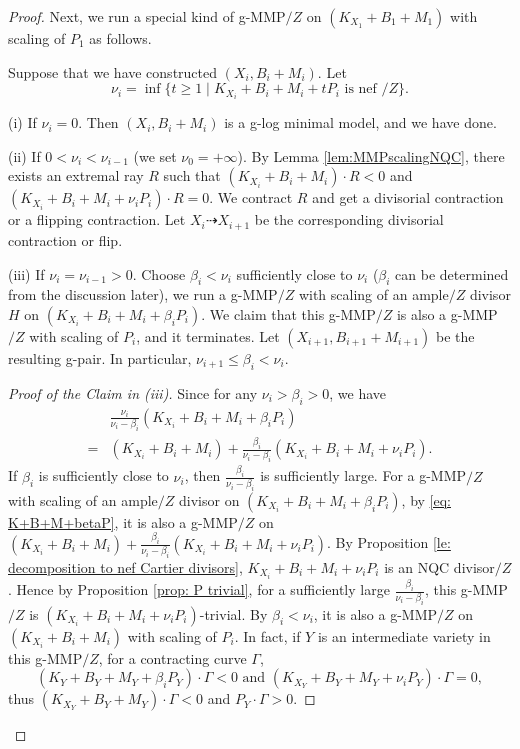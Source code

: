\documentclass[11pt]{amsart}
\begin{document}
\begin{proof}
	Next, we run a special kind of g-MMP$/Z$ on $(K_{X_1}+B_1+M_1)$ with scaling of $P_1$ as follows. 
	
	Suppose that we have constructed $(X_i,B_i+M_i)$. Let 
	\[
	\nu_i = \inf\{t \geq 1 \mid K_{X_i}+B_i+M_i+t P_i \text{~is nef~}/Z\}.
	\] 
	
	(i) If $\nu_i=0$. Then $({X_i}, B_i+M_i)$ is a g-log minimal model, and we have done. 
	
	(ii) If $0<\nu_i<\nu_{i-1}$ (we set $\nu_0=+\infty$). By Lemma \ref{lem:MMPscalingNQC}, there exists an extremal ray $R$ such that $(K_{X_i}+B_i+M_i)\cdot R<0$ and $(K_{X_i}+B_i+M_i+\nu_iP_i)\cdot R=0$. We contract $R$ and get a divisorial contraction or a flipping contraction. Let $X_i\dashrightarrow X_{i+1}$ be the corresponding divisorial contraction or flip.
	
	(iii) If $\nu_i=\nu_{i-1}>0$. Choose $\beta_i<\nu_i$ sufficiently close to $\nu_i$ ($\beta_i$ can be determined from the discussion later), we run a g-MMP$/Z$ with scaling of an ample$/Z$ divisor $H$ on $(K_{X_i}+B_i+M_i+\beta_i P_i)$. We claim that this g-MMP$/Z$ is also a g-MMP$/Z$ with scaling of $P_i$, and it terminates. Let $(X_{i+1}, B_{i+1}+M_{i+1})$ be the resulting g-pair. In particular, $\nu_{i+1} \leq \beta_i<\nu_i$.
	
\begin{proof}[Proof of the Claim in (iii)]	
	Since for any $\nu_i>\beta_i>0$, we have
	\begin{equation}\label{eq: K+B+M+betaP}
	\begin{split}
	&\frac{\nu_i}{\nu_i-\beta_{i}}(K_{X_i}+B_i+M_i+\beta_i P_i)\\
	=&(K_{X_i}+B_i+M_i)+\frac{\beta_i}{\nu_i-\beta_i}(K_{X_i}+B_i+M_i+\nu_i P_i).
	\end{split}
	\end{equation} 
	If $\beta_i$ is sufficiently close to $\nu_i$, then $\frac{\beta_i}{\nu_i-\beta_i}$ is sufficiently large. For a g-MMP$/Z$ with scaling of an ample$/Z$ divisor on $(K_{X_i}+B_i+M_i+\beta_i P_i)$, by \eqref{eq: K+B+M+betaP}, it is also a g-MMP$/Z$ on $(K_{X_i}+B_i+M_i)+\frac{\beta_i}{\nu_i-\beta_i}(K_{X_i}+B_i+M_i+\nu_i P_i)$. By Proposition \ref{le: decomposition to nef Cartier divisors}, $K_{X_i}+B_i+M_i+\nu_i P_i$ is an NQC divisor$/Z$. Hence by Proposition \ref{prop: P trivial},  for a sufficiently large $\frac{\beta_i}{\nu_i-\beta_i}$, this g-MMP$/Z$ is $(K_{X_i}+B_i+M_i+\nu_i P_i)$-trivial. By $\beta_i<\nu_i$, it is also a g-MMP$/Z$ on $(K_{X_i}+B_i+M_i)$ with scaling of $P_i$. In fact, if $Y$ is an intermediate variety in this g-MMP$/Z$, for a contracting curve $\Gamma$,
	\[
	(K_{Y}+B_Y+M_Y+\beta_i P_Y)\cdot \Gamma<0 \text{~and~} (K_{X_Y}+B_Y+M_Y+\nu_i P_Y) \cdot \Gamma=0,
	\] thus $(K_{X_Y}+B_Y+M_Y)\cdot \Gamma<0$ and $P_Y \cdot \Gamma>0$.
	

\end{proof}
\end{proof}
\end{document}
